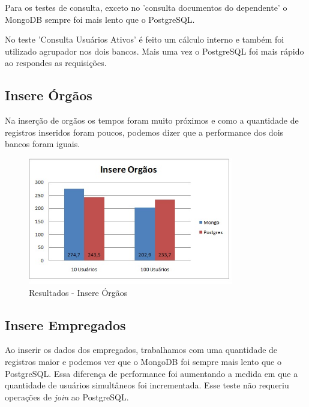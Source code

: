 Para os testes de consulta, exceto no 'consulta documentos do dependente' o MongoDB sempre foi mais lento que o PostgreSQL.

No teste 'Consulta Usuários Ativos' é feito um cálculo interno e também foi utilizado agrupador nos dois bancos. Mais uma vez o PostgreSQL foi mais rápido ao respondes as requisições.

\subsection{Insere Órgãos}

 Na inserção de orgãos os tempos foram muito próximos e como a quantidade de registros inseridos foram poucos, podemos dizer que a performance dos dois bancos foram iguais.

\begin{figure}[!htbp]
	\begin{center}
		\includegraphics[width=0.8\textwidth]{resultados/insere_orgaos}
	\end{center}
	\caption{Resultados - Insere Órgãos}
	\label{fig:resultinsereorgaos}
\end{figure}

\subsection{Insere Empregados}

Ao inserir os dados dos empregados, trabalhamos com uma quantidade de registros maior e podemos ver que o MongoDB foi sempre mais lento que o PostgreSQL. Essa diferença de performance foi aumentando a medida em que a quantidade de usuários simultâneos foi incrementada. Esse teste não requeriu operações de \textit{join} ao PostgreSQL.

